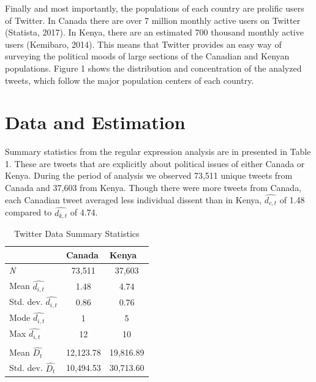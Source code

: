 \documentclass[12pt]{article}
\begin{document}
\begin{spacing}{1.5}
Finally and most importantly, the populations of each country are prolific users of Twitter. In Canada there are over 7 million monthly active users on Twitter (Statista, 2017). In Kenya, there are an estimated 700 thousand monthly active users (Kemibaro, 2014). This means that Twitter provides an easy way of surveying the political moods of large sections of the Canadian and Kenyan populations. Figure 1 shows the distribution and concentration of the analyzed tweets, which follow the major population centers of each country. 





\section*{Data and Estimation}   

Summary statistics from the regular expression analysis are in presented in Table 1. These are tweets that are explicitly about political issues of either Canada or Kenya. During the period of analysis we observed 73,511 unique tweets from Canada and 37,603 from Kenya. Though there were more tweets from Canada, each Canadian tweet averaged less individual dissent than in Kenya, $\hat{d_{c,t}}$ of 1.48 compared to $\hat{d_{k,t}}$ of 4.74.  

\begin{table}[]
\centering
\begin{tabular}{lcc}
\toprule
\multicolumn{1}{l}{} & \multicolumn{1}{l}{\textbf{Canada}} & \multicolumn{1}{l}{\textbf{Kenya}} \\ \hline
\textit{N} & 73,511 & 37,603 \\
Mean $\hat{d_{i,t}}$ & 1.48 & 4.74 \\
Std. dev. $\hat{d_{i,t}}$ & 0.86 & 0.76 \\
Mode $\hat{d_{i,t}}$ & 1 & 5 \\
Max $\hat{d_{i,t}}$ & 12 & 10 \\
& & \\
Mean $\hat{D_t}$ & 12,123.78 & 19,816.89 \\
Std. dev. $\hat{D_t}$ & 10,494.53 & 30,713.60 \\
\hline
\end{tabular}
\caption{Twitter Data Summary Statistics}
\end{table}


\end{spacing}
\end{document}
